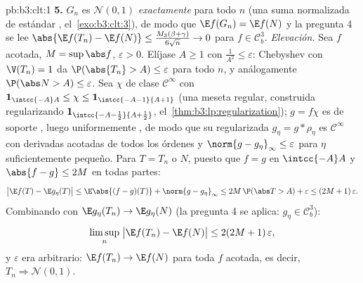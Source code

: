 \begin{solution}{pb:b3:clt:1}
\textbf{5.} $G_n$ es $\mathcal N(0,1)$ \emph{exactamente} para todo $n$
(una suma normalizada de 
estándar ,
el~\cref{exo:b3:clt:3}), de modo que $\E f(G_n) = \E f(N)$ y la pregunta
4 se lee $\abs{\E f(T_n) - \E f(N)} \leq
\frac{M_3(\beta+\gamma)}{6\sqrt n} \to 0$ para $f \in
\mathcal C^3_b$. \emph{Elevación.} Sea $f$
 acotada, $M = \sup\abs f$,
$\varepsilon > 0$. Elíjase $A
\geq 1$ con $\frac1{A^2} \leq \varepsilon$: Chebyshev con $\V(T_n) = 1$
da $\P(\abs{T_n} > A) \leq \varepsilon$ para todo $n$, y análogamente
$\P(\abs N > A) \leq \varepsilon$. Sea $\chi$ de clase
$\mathcal C^\infty$ con $\mathbf 1_{\intcc{-A}A} \leq \chi \leq
\mathbf 1_{\intcc{-A-1}{A+1}}$ (una meseta regular, construida
regularizando $\mathbf 1_{\intcc{-A-\frac12}{A+\frac12}}$,
el~\cref{thm:b3:lp:regularization}); $g = f\chi$ es
 de soporte
, luego uniformemente
, de modo que su
regularizada $g_\eta = g * \rho_\eta$ es $\mathcal
C^\infty$ con derivadas acotadas de todos los órdenes y
$\norm{g - g_\eta}_\infty \leq \varepsilon$ para $\eta$ suficientemente
pequeño. Para $T = T_n$ o $N$, puesto que $f = g$ en $\intcc{-A}A$ y
$\abs{f - g} \leq 2M$ en todas partes:
\[
\bigl|\E f(T) - \E g_\eta(T)\bigr| \leq
\E\abs{(f - g)(T)} + \norm{g - g_\eta}_\infty
\leq 2M\,\P(\abs T > A) + \varepsilon \leq
(2M + 1)\,\varepsilon .
\]
Combinando con $\E g_\eta(T_n) \to \E g_\eta(N)$ (la pregunta 4 se
aplica: $g_\eta \in \mathcal C^3_b$):
\[
\limsup_n\;\bigl|\E f(T_n) - \E f(N)\bigr| \leq
2(2M + 1)\,\varepsilon ,
\]
y $\varepsilon$ era arbitrario: $\E f(T_n) \to \E f(N)$ para toda $f$
 acotada, es decir,
$T_n \Rightarrow
\mathcal N(0,1)$.


\end{solution}
